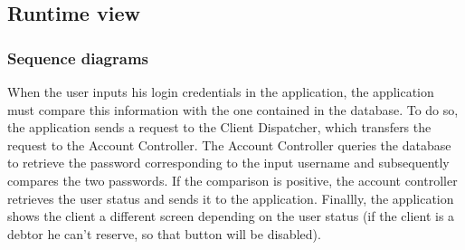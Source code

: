 \documentclass{article}
\begin{document}
\subsection{Runtime view}
\subsubsection{Sequence diagrams}


\begin{figure}[ht]
\end{figure}
When the user inputs his login credentials in the application, the application must compare this information with the one contained in the database. To do so, the application sends a request to the Client Dispatcher, which transfers the request to the Account Controller. The Account Controller queries the database to retrieve the password corresponding to the input username and subsequently compares the two passwords. If the comparison is positive, the account controller retrieves the user status and sends it to the application. Finallly, the application shows the client a different screen depending on the user status (if the client is a debtor he can't reserve, so that button will be disabled).
\newpage
\begin{figure}[ht]
\end{figure}
\end{document}

